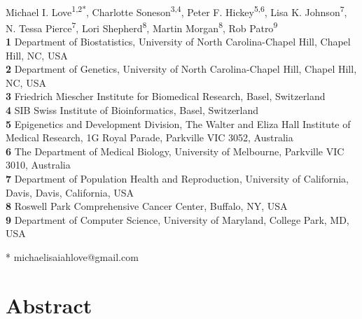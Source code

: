 \documentclass[10pt,letterpaper]{article}
\begin{document}
\vspace*{0.2in}

\begin{flushleft}
{\Large
\textbf{}
}
\newline
\\
Michael I. Love\textsuperscript{1,2*},
Charlotte Soneson\textsuperscript{3,4},
Peter F. Hickey\textsuperscript{5,6},
Lisa K. Johnson\textsuperscript{7},
N. Tessa Pierce\textsuperscript{7},
Lori Shepherd\textsuperscript{8},
Martin Morgan\textsuperscript{8},
Rob Patro\textsuperscript{9}
\\
\bigskip
\textbf{1} Department of Biostatistics, University of North Carolina-Chapel Hill, Chapel Hill, NC, USA
\\
\textbf{2} Department of Genetics, University of North Carolina-Chapel Hill, Chapel Hill, NC, USA
\\
\textbf{3} Friedrich Miescher Institute for Biomedical Research, Basel, Switzerland
\\
\textbf{4} SIB Swiss Institute of Bioinformatics, Basel, Switzerland
\\
\textbf{5} Epigenetics and Development Division, The Walter and Eliza Hall Institute of Medical Research, 1G Royal Parade, Parkville VIC 3052, Australia
\\
\textbf{6} The Department of Medical Biology, University of Melbourne, Parkville VIC 3010, Australia
\\
\textbf{7} Department of Population Health and Reproduction, University of California, Davis, Davis, California, USA
\\
\textbf{8} Roswell Park Comprehensive Cancer Center, Buffalo, NY, USA
\\
\textbf{9} Department of Computer Science, University of Maryland, College Park, MD, USA
\\
\bigskip

* michaelisaiahlove@gmail.com

\end{flushleft}

\section*{Abstract}
\end{document}
